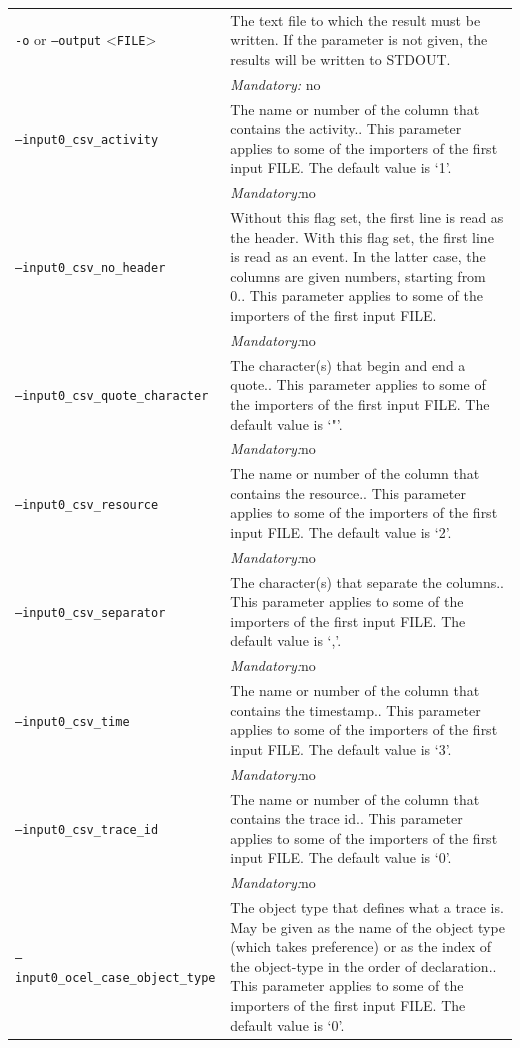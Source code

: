 {\begin{tabularx}{\linewidth}{lX}
\texttt{-o} or \texttt{--output} <\texttt{FILE}> &
The text file to which the result must be written. If the parameter is not given, the results will be written to STDOUT.\\
&\textit{Mandatory:} \quad no\\
\texttt{--input0\_csv\_activity} & The name or number of the column that contains the activity.. This parameter applies to some of the importers of the first input FILE. The default value is `1'.\\
&\textit{Mandatory:}\quad no\\
\texttt{--input0\_csv\_no\_header} & Without this flag set, the first line is read as the header. 
    With this flag set, the first line is read as an event. In the latter case, the columns are given numbers, starting from 0.. This parameter applies to some of the importers of the first input FILE. \\
&\textit{Mandatory:}\quad no\\
\texttt{--input0\_csv\_quote\_character} & The character(s) that begin and end a quote.. This parameter applies to some of the importers of the first input FILE. The default value is `"'.\\
&\textit{Mandatory:}\quad no\\
\texttt{--input0\_csv\_resource} & The name or number of the column that contains the resource.. This parameter applies to some of the importers of the first input FILE. The default value is `2'.\\
&\textit{Mandatory:}\quad no\\
\texttt{--input0\_csv\_separator} & The character(s) that separate the columns.. This parameter applies to some of the importers of the first input FILE. The default value is `,'.\\
&\textit{Mandatory:}\quad no\\
\texttt{--input0\_csv\_time} & The name or number of the column that contains the timestamp.. This parameter applies to some of the importers of the first input FILE. The default value is `3'.\\
&\textit{Mandatory:}\quad no\\
\texttt{--input0\_csv\_trace\_id} & The name or number of the column that contains the trace id.. This parameter applies to some of the importers of the first input FILE. The default value is `0'.\\
&\textit{Mandatory:}\quad no\\
\texttt{--input0\_ocel\_case\_object\_type} & The object type that defines what a trace is. May be given as the name of the object type (which takes preference) or as the index of the object-type in the order of declaration.. This parameter applies to some of the importers of the first input FILE. The default value is `0'.\\

\end{tabularx}}
